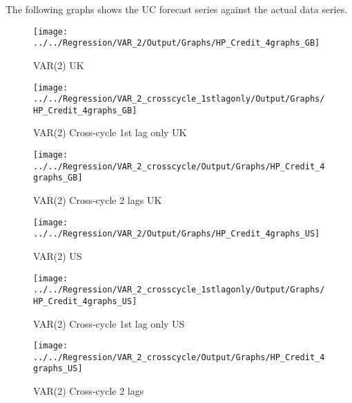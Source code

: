 \documentclass[
  12pt,
]{article}
\begin{document}
        
        The following graphs shows the UC forecast series against the actual data series.
        

\begin{figure}

{\centering \texttt{[image: ../../Regression/VAR\_2/Output/Graphs/HP\_Credit\_4graphs\_GB]} 

}

\caption{VAR(2) UK}\label{fig:unnamed-chunk-1}
\end{figure}

\begin{figure}

{\centering \texttt{[image: ../../Regression/VAR\_2\_crosscycle\_1stlagonly/Output/Graphs/HP\_Credit\_4graphs\_GB]} 

}

\caption{VAR(2) Cross-cycle 1st lag only UK}\label{fig:unnamed-chunk-2}
\end{figure}

\begin{figure}

{\centering \texttt{[image: ../../Regression/VAR\_2\_crosscycle/Output/Graphs/HP\_Credit\_4graphs\_GB]} 

}

\caption{VAR(2) Cross-cycle 2 lags UK}\label{fig:unnamed-chunk-3}
\end{figure}

\begin{figure}

{\centering \texttt{[image: ../../Regression/VAR\_2/Output/Graphs/HP\_Credit\_4graphs\_US]} 

}

\caption{VAR(2) US}\label{fig:unnamed-chunk-4}
\end{figure}

\begin{figure}

{\centering \texttt{[image: ../../Regression/VAR\_2\_crosscycle\_1stlagonly/Output/Graphs/HP\_Credit\_4graphs\_US]} 

}

\caption{VAR(2) Cross-cycle 1st lag only US}\label{fig:unnamed-chunk-5}
\end{figure}

\begin{figure}

{\centering \texttt{[image: ../../Regression/VAR\_2\_crosscycle/Output/Graphs/HP\_Credit\_4graphs\_US]} 

}

\caption{VAR(2) Cross-cycle 2 lags}\label{fig:unnamed-chunk-6}
\end{figure}
\end{document}
